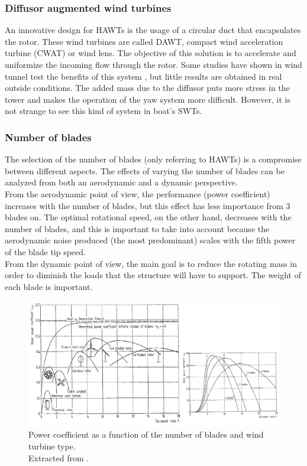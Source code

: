 \documentclass[../TFG_Report.tex]{subfiles}
\begin{document}
\subsubsection{Diffusor augmented wind turbines}

An innovative design for HAWTs is the usage of a circular duct that encapsulates the rotor. These wind turbines are called DAWT, compact wind acceleration turbine (CWAT) or wind lens. The objective of this solution is to accelerate and uniformize the incoming flow through the rotor. Some studies have shown in wind tunnel test the benefits of this system \cite{DAWT}, but little results are obtained in real outside conditions. The added mass due to the diffusor puts more stress in the tower and makes the operation of the yaw system more difficult. However, it is not strange to see this kind of system in boat's SWTs. \cite{DesignControl}


\subsubsection{Number of blades}

The selection of the number of blades (only referring to HAWTs) is a compromise between different aspects. The effects of varying the number of blades can be analyzed from both an aerodynamic and a dynamic perspective. \\

From the aerodynamic point of view, the performance (power coefficient) increases with the number of blades, but this effect has less importance from 3 blades on. The optimal rotational speed, on the other hand, decreases with the number of blades, and this is important to take into account because the aerodynamic noise produced (the most predominant)  scales with the fifth power of the blade tip speed. \\

From the dynamic point of view, the main goal is to reduce the rotating mass in order to diminish the loads that the structure will have to support. The weight of each blade is important. \\

\begin{figure}[h!]
	\centering
	\includegraphics[width=1\linewidth]{Images/Cp_number_blades}
	\caption[Power coefficient as a function of the number of blades and wind turbine type]{Power coefficient as a function of the number of blades and wind turbine type. \\ Extracted from \cite{Apunts}.}
	\label{fig:cpnumberblades}
\end{figure}
\end{document}
